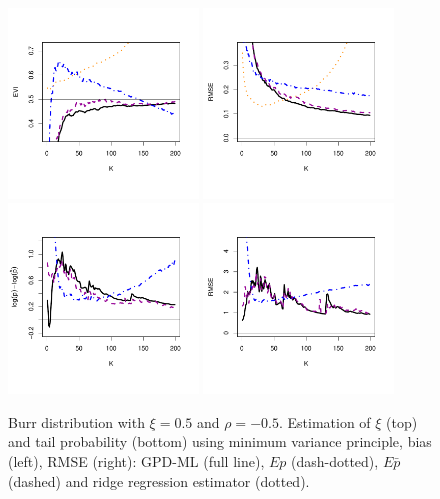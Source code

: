 \documentclass[twoside,leqno,11pt]{article}
\begin{document}
\newpage

 \begin{figure}[!ht]
  \centering
\includegraphics[width=0.45\textwidth]{burr05GPD_evi.pdf} 
\includegraphics[width=0.45\textwidth]{burr05GPD_rmse.pdf} \\
\includegraphics[width=0.45\textwidth]{burr05GPD_tail.pdf}
\includegraphics[width=0.45\textwidth]{burr05GPD_tail_rmse.pdf}  
 \caption{ Burr distribution with $\xi=0.5$ and $\rho=-0.5$. Estimation of $\xi$ (top) and tail probability (bottom) using minimum variance principle, bias (left), RMSE (right): GPD-ML (full line), $Ep$ (dash-dotted), $E\bar{p}$ (dashed) and ridge regression estimator (dotted). }
\end{figure}
\end{document}
